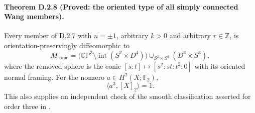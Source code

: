 \paragraph{Theorem D.2.8 (Proved: the oriented type of all simply connected Wang members).}
Every member of D.2.7 with $n=\pm1$, arbitrary $k>0$ and
arbitrary $r\in\mathbb Z$, is orientation-preservingly
diffeomorphic to
\[
 M_{\mathrm{conic}}=
 \bigl(\mathbb {CP}^3\setminus\operatorname{int}
       (S^2\times D^4)\bigr)
 \mathop{\cup}_{S^2\times S^3}(D^3\times S^3),
\]
where the removed sphere is the conic
$[s:t]\mapsto[s^2:st:t^2:0]$ with its oriented normal framing.
For the nonzero $a\in H^2(X;\mathbb F_2)$,
\[
 \langle a^3,[X]_2\rangle=1.
\]
This also supplies an independent check of the smooth
classification asserted for order three in
\cite[Theorem 7.1 and Appendix B]{manWang26}.
